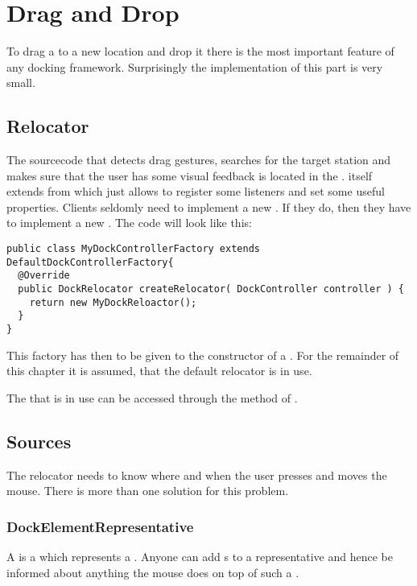 \section{Drag and Drop}
To drag a  to a new location and drop it there is the most important feature of any docking framework. Surprisingly the implementation of this part is very small.

\subsection{Relocator}
The sourcecode that detects drag gestures, searches for the target station and makes sure that the user has some visual feedback is located in the \linebreak {}.  itself extends from \linebreak {} which just allows to register some listeners and set some useful properties. Clients seldomly need to implement a new . If they do, then they have to implement a new . The code will look like this:

\begin{lstlisting}
public class MyDockControllerFactory extends DefaultDockControllerFactory{
  @Override
  public DockRelocator createRelocator( DockController controller ) {
    return new MyDockReloactor();
  }
}
\end{lstlisting}
This factory has then to be given to the constructor of a . For the remainder of this chapter it is assumed, that the default relocator is in use.

The  that is in use can be accessed through the method  of .

\subsection{Sources}
The relocator needs to know where and when the user presses and moves the mouse. There is more than one solution for this problem.

\subsubsection{DockElementRepresentative}
A  is a  which represents a . Anyone can add s to a representative and hence be informed about anything the mouse does on top of such a .

